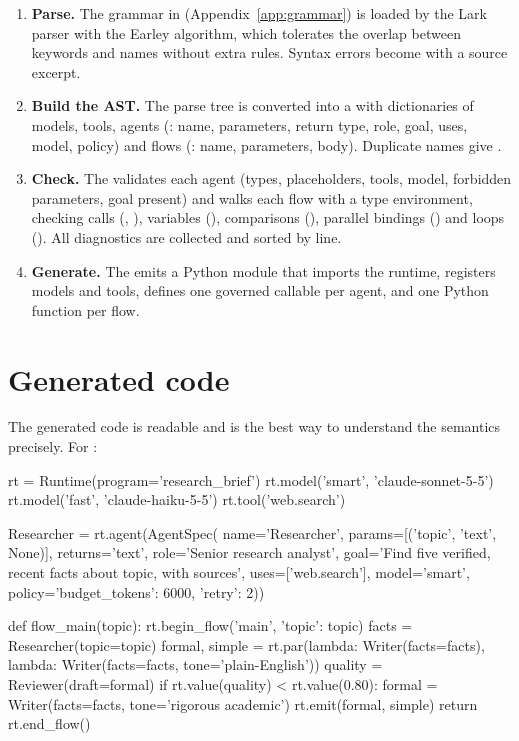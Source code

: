 \begin{enumerate}
  \item \textbf{Parse.} The grammar in  (Appendix~\ref{app:grammar}) is loaded by the Lark parser with the Earley algorithm, which tolerates the overlap between keywords and names without extra rules. Syntax errors become  with a source excerpt.
  \item \textbf{Build the AST.} The parse tree is converted into a  with dictionaries of models, tools, agents (: name, parameters, return type, role, goal, uses, model, policy) and flows (: name, parameters, body). Duplicate names give .
  \item \textbf{Check.} The  validates each agent (types, placeholders, tools, model, forbidden parameters, goal present) and walks each flow with a type environment, checking calls (, ), variables (), comparisons (), parallel bindings () and loops (). All diagnostics are collected and sorted by line.
  \item \textbf{Generate.} The  emits a Python module that imports the runtime, registers models and tools, defines one governed callable per agent, and one Python function per flow.
\end{enumerate}

\section{Generated code}

The generated code is readable and is the best way to understand the semantics precisely. For :

\begin{pycode}[title=build/research\_brief.py (excerpt)]
rt = Runtime(program='research_brief')
rt.model('smart', 'claude-sonnet-5-5')
rt.model('fast', 'claude-haiku-5-5')
rt.tool('web.search')

Researcher = rt.agent(AgentSpec(
    name='Researcher', params=[('topic', 'text', None)], returns='text',
    role='Senior research analyst',
    goal='Find five verified, recent facts about {topic}, with sources',
    uses=['web.search'], model='smart', policy={'budget_tokens': 6000, 'retry': 2}))

def flow_main(topic):
    rt.begin_flow('main', {'topic': topic})
    facts = Researcher(topic=topic)
    formal, simple = rt.par(lambda: Writer(facts=facts),
                            lambda: Writer(facts=facts, tone='plain-English'))
    quality = Reviewer(draft=formal)
    if rt.value(quality) < rt.value(0.80):
        formal = Writer(facts=facts, tone='rigorous academic')
    rt.emit(formal, simple)
    return rt.end_flow()
\end{pycode}

